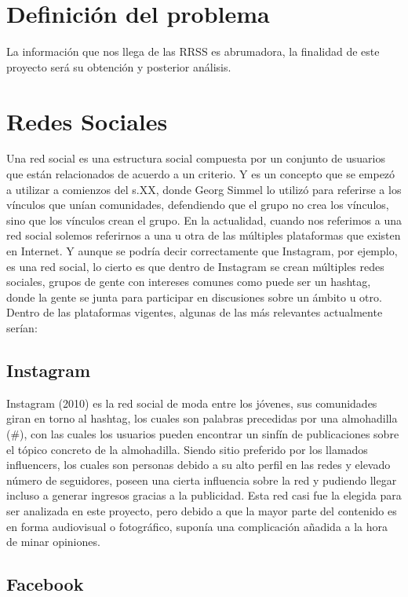 	\section{Definición del problema}
	
	La información que nos llega de las RRSS es abrumadora, la finalidad de este proyecto será su obtención y posterior análisis.
	
	\section{Redes Sociales}
	
	Una red social es una estructura social compuesta por un conjunto de usuarios que están relacionados de acuerdo a un criterio. Y es un concepto que se empezó a utilizar a comienzos del s.XX, donde Georg Simmel lo utilizó para referirse a los vínculos que unían comunidades, defendiendo que el grupo no crea los vínculos, sino que los vínculos crean el grupo. En la actualidad, cuando nos referimos a una red social solemos referirnos a una u otra de las múltiples plataformas que existen en Internet. Y aunque se podría decir correctamente que Instagram, por ejemplo, es una red social, lo cierto es que dentro de Instagram se crean múltiples redes sociales, grupos de gente con intereses comunes como puede ser un hashtag, donde la gente se junta para participar en discusiones sobre un ámbito u otro. Dentro de las plataformas vigentes, algunas de las más relevantes actualmente serían: 
	
	\subsection{Instagram}
	
	Instagram (2010) es la red social de moda entre los jóvenes, sus comunidades giran en torno al hashtag, los cuales son palabras precedidas por una almohadilla (\#), con las cuales los usuarios pueden encontrar un sinfín de publicaciones sobre el tópico concreto de la almohadilla. Siendo sitio preferido por los llamados influencers, los cuales son personas debido a su alto perfil en las redes y elevado número de seguidores, poseen una cierta influencia sobre la red y pudiendo llegar incluso a generar ingresos gracias a la publicidad. Esta red casi fue la elegida para ser analizada en este proyecto, pero debido a que la mayor parte del contenido es en forma audiovisual o fotográfico, suponía una complicación añadida a la hora de minar opiniones. 
	
	\subsection{Facebook}
	
